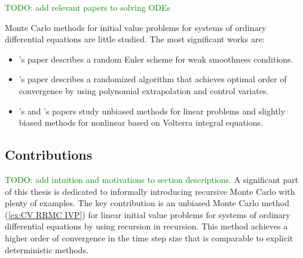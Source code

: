 \documentclass[a4paper,12pt]{article}
\begin{document}
\begin{related}

    \textcolor{green}{
        TODO: add relevant papers to solving ODEs
    }

    Monte Carlo methods for initial value problems for systems of ordinary
    differential equations are little studied. The most significant works are:
    \begin{itemize}
        \item \citeauthor{jentzen_random_2009}'s \citeyear{jentzen_random_2009}
              \cite{jentzen_random_2009} paper describes a random Euler scheme for
              weak smoothness conditions.

        \item \citeauthor{daun_randomized_2011}'s \citeyear{daun_randomized_2011}
              \cite{daun_randomized_2011} paper describes a randomized algorithm that
              achieves optimal order of convergence by using polynomial
              extrapolation and control variates.

        \item \citeauthor{ermakov_monte_2019}'s \citeyear{ermakov_monte_2019}
              \cite{ermakov_monte_2019}
              and \citeauthor{ermakov_monte_2021}'s \citeyear{ermakov_monte_2021}
              \cite{ermakov_monte_2021}
              papers study unbiased  methods
              for linear problems and slightly biased methods for nonlinear based
              on Volterra integral equations.

    \end{itemize}


\end{related}

\subsection{Contributions}

\textcolor{green}{
    TODO: add intuition and motivations to section descriptions.
}
A significant part of this thesis is dedicated to informally introducing recursive Monte Carlo
with plenty of examples.
The key contribution is an unbiased Monte Carlo method
(\ref{ex:CV RRMC IVP}) for
linear initial value problems for systems of ordinary
differential equations by using recursion in recursion.
This method achieves a higher order of convergence
in the time step size that is comparable to explicit
deterministic methods.
\end{document}
